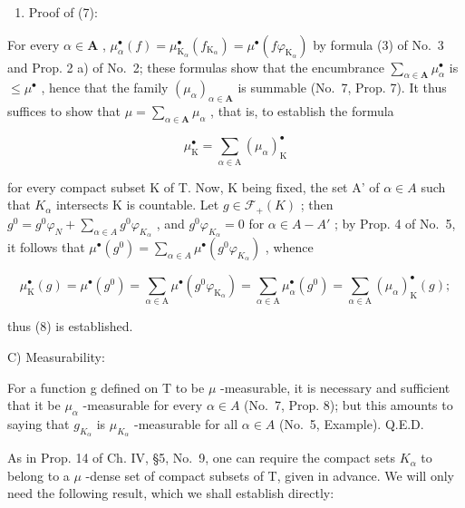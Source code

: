 \begin{enumerate}
\def\labelenumi{\Alph{enumi})}
\setcounter{enumi}{1}
\tightlist
\item
  Proof of (7):
\end{enumerate}

For every \(\alpha \in \mathbf{A}\) , \(\mu_{\alpha}^{\bullet}(f) = \mu_{\mathrm{K}_{\alpha}}^{\bullet}(f_{\mathrm{K}_{\alpha}}) = \mu^{\bullet}(f\varphi_{\mathrm{K}_{\alpha}})\) by formula (3) of No.~3 and Prop. 2 a) of No.~2; these formulas show that the encumbrance \(\sum_{\alpha \in \mathbf{A}} \mu_{\alpha}^{\bullet}\) is \(\leqslant \mu^{\bullet}\) , hence that the family \((\mu_{\alpha})_{\alpha \in \mathbf{A}}\) is summable (No.~7, Prop. 7). It thus suffices to show that \(\mu = \sum_{\alpha \in \mathbf{A}} \mu_{\alpha}\) , that is, to establish the formula

\[
\mu_ {\mathrm{K}} ^ {\bullet} = \sum_ {\alpha \in \mathrm{A}} (\mu_ {\alpha}) _ {\mathrm{K}} ^ {\bullet}\tag{8}
\]

for every compact subset K of T. Now, K being fixed, the set A' of \(\alpha \in A\) such that \(K_{\alpha}\) intersects K is countable. Let \(g \in \mathcal{F}_{+}(K)\) ; then \(g^{0} = g^{0}\varphi_{N} + \sum_{\alpha \in A} g^{0}\varphi_{K_{\alpha}}\) , and \(g^{0}\varphi_{K_{\alpha}} = 0\) for \(\alpha \in A - A'\) ; by Prop. 4 of No.~5, it follows that \(\mu^{\bullet}(g^{0}) = \sum_{\alpha \in A} \mu^{\bullet}(g^{0}\varphi_{K_{\alpha}})\) , whence

\[
\mu_ {\mathrm{K}} ^ {\bullet} (g) = \mu^ {\bullet} (g ^ {0}) = \sum_ {\alpha \in \mathrm{A}} \mu^ {\bullet} (g ^ {0} \varphi_ {\mathrm{K} _ {\alpha}}) = \sum_ {\alpha \in \mathrm{A}} \mu_ {\alpha} ^ {\bullet} (g ^ {0}) = \sum_ {\alpha \in \mathrm{A}} (\mu_ {\alpha}) _ {\mathrm{K}} ^ {\bullet} (g);
\]

thus (8) is established.

C) Measurability:

For a function g defined on T to be \(\mu\) -measurable, it is necessary and sufficient that it be \(\mu_{\alpha}\) -measurable for every \(\alpha \in A\) (No.~7, Prop. 8); but this amounts to saying that \(g_{K_{\alpha}}\) is \(\mu_{K_{\alpha}}\) -measurable for all \(\alpha \in A\) (No.~5, Example). Q.E.D.

As in Prop. 14 of Ch. IV, §5, No.~9, one can require the compact sets \(K_{\alpha}\) to belong to a \(\mu\) -dense set of compact subsets of T, given in advance. We will only need the following result, which we shall establish directly:

